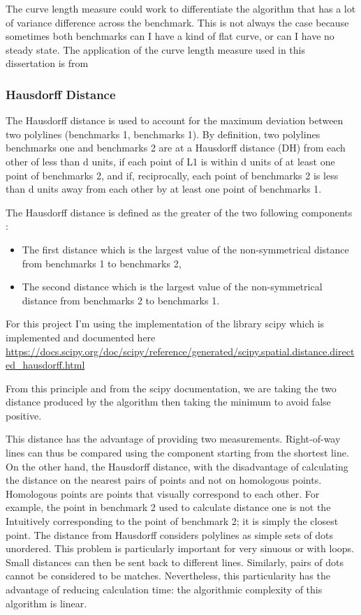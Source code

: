 \documentclass{article}
\begin{document}
The curve length measure could work to differentiate the algorithm that has a lot of variance difference across the benchmark. This is not always the case because sometimes both benchmarks can I have a kind of flat curve, or can I have no steady state.
The application of the curve length measure used in this dissertation is from \cite{jekel2019similarity}
\subsubsection{Hausdorff Distance }
The Hausdorff distance \cite{belogay1997calculating} is used to account for the maximum deviation between two polylines (benchmarks 1, benchmarks 1). By definition, two polylines benchmarks one and benchmarks 2 are at a Hausdorff distance (DH) from each other of less than d units, if each point of L1 is within d units of at least one point of benchmarks 2, and if, reciprocally, each point of benchmarks 2 is less than d units away from each other by at least one point of benchmarks 1.

The Hausdorff distance is defined as the greater of the two following components :

\begin{itemize}
    \item The first distance which is the largest value of the non-symmetrical distance from benchmarks 1 to benchmarks 2,
    \item The second distance which is the largest value of the non-symmetrical distance from benchmarks 2 to benchmarks 1.
\end{itemize}


For this project I'm using the implementation of the library scipy which is implemented and documented here \url{https://docs.scipy.org/doc/scipy/reference/generated/scipy.spatial.distance.directed_hausdorff.html}

From this principle and from the scipy documentation, we are taking the two distance produced by the algorithm then taking the minimum to avoid false positive.

This distance has the advantage of providing two measurements. Right-of-way lines can thus be compared using the component starting from the shortest line. On the other hand, the Hausdorff distance, with the disadvantage of calculating the
distance on the nearest pairs of points and not on homologous points. Homologous points are points that visually correspond to each other. For example, the point in benchmark 2 used to calculate distance one is not the Intuitively corresponding to the point of benchmark 2; it is simply the closest point. The distance from Hausdorff considers polylines as simple sets of dots unordered. This problem is particularly important for very sinuous or with loops. Small distances can then be sent back to different lines. Similarly, pairs of dots cannot be considered to be matches. Nevertheless, this particularity has the advantage of reducing calculation time: the algorithmic complexity of this algorithm is linear. 
\end{document}
